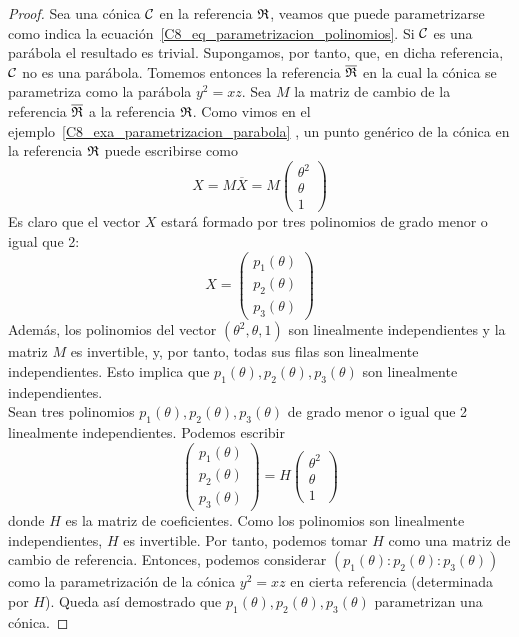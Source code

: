 \begin{proof}
	Sea una cónica $\mathcal{C}$ en la referencia $\mathfrak{R}$, veamos que puede parametrizarse como indica la ecuación~\eqref{C8_eq_parametrizacion_polinomios}. Si $\mathcal{C}$ es una parábola el resultado es trivial. Supongamos, por tanto, que, en dicha referencia, $\mathcal{C}$ no es una parábola. Tomemos entonces la referencia $\overline{\mathfrak{R}}$ en la cual la cónica se parametriza como la parábola $y^2=xz$. Sea $M$ la matriz de cambio de la referencia $\overline{\mathfrak{R}}$ a la referencia $\mathfrak{R}$. Como vimos en el ejemplo~\ref{C8_exa_parametrizacion_parabola} , un punto genérico de la cónica en la referencia $\mathfrak{R}$ puede escribirse como
	\begin{equation}
		X=M\overline{X}=M
		\left( \begin{array}{c}
		\theta^2\\\theta\\1
		\end{array}\right)
	\end{equation}
	Es claro que el vector $X$ estará formado por tres polinomios de grado menor o igual que 2:
	\[X=\left( \begin{array}{c}
	p_1(\theta)\\p_2(\theta)\\p_3(\theta)
	\end{array}\right)\]
	Además, los polinomios del vector $(\theta^2,\theta,1)$ son linealmente independientes y la matriz $M$ es invertible, y, por tanto, todas sus filas son linealmente independientes. Esto implica que $p_1(\theta),p_2(\theta),p_3(\theta)$ son linealmente independientes.\\
	
	Sean tres polinomios $p_1(\theta),p_2(\theta),p_3(\theta)$ de grado menor o igual que 2 linealmente independientes. Podemos escribir
	\begin{equation*}
		\left( \begin{array}{c}
		p_1(\theta)\\p_2(\theta)\\p_3(\theta)
		\end{array}\right)=H
		\left( \begin{array}{c}
		\theta^2\\\theta\\1
	\end{array}\right)
	\end{equation*}
	donde $H$ es la matriz de coeficientes. Como los polinomios son linealmente independientes, $H$ es invertible. Por tanto, podemos tomar $H$ como una matriz de cambio de referencia. Entonces, podemos considerar $(p_1(\theta):p_2(\theta):p_3(\theta))$ como la parametrización de la cónica $y^2=xz$ en cierta referencia (determinada por $H$). Queda así demostrado que
	$p_1(\theta),p_2(\theta),p_3(\theta)$ parametrizan una cónica.
\end{proof}
